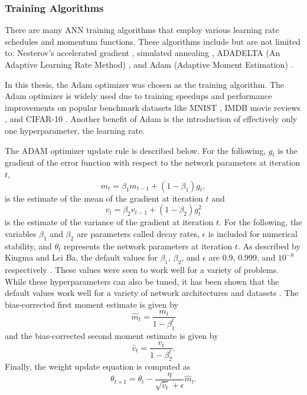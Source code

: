 \subsubsection{Training Algorithms}

There are many ANN training algorithms that employ various learning rate schedules and momentum functions. These algorithms include but are not limited to: Nesterov's accelerated gradient \cite{nesterov1983}, simulated annealing \cite{Kirkpatrick1983}, ADADELTA (An Adaptive Learning Rate Method) \cite{ADADELTA}, and Adam (Adaptive Moment Estimation) \cite{Kingma2015}. 

In this thesis, the Adam optimizer was chosen as the training algorithm. The Adam optimizer is widely used due to training speedups and performance improvements on popular benchmark datasets like MNIST \cite{lecun98}, IMDB movie reviews \cite{Maas2011}, and CIFAR-10 \cite{Krizhevsky2009}. Another benefit of Adam is the introduction of effectively only one hyperparameter, the learning rate.

The ADAM optimizer update rule is described below. For the following, $g_t$ is the gradient of the error function with respect to the network parameters at iteration $t$, 
\begin{equation} \label{eq:adam1}
m_t = \beta_1 m_{t-1} + (1 - \beta_1) g_t,
\end{equation}
is the estimate of the mean of the gradient at iteration $t$ and
\begin{equation} \label{eq:adam2}
v_t = \beta_2 v_{t-1} + (1 - \beta_2) g_t^2
\end{equation}
is the estimate of the variance of the gradient at iteration $t$. For the following, the variables $\beta_1$ and $\beta_2$ are parameters called decay rates, $\epsilon$ is included for numerical stability, and $\theta_t$ represents the network parameters at iteration $t$. As described by Kingma and Lei Ba, the default values for $\beta_1$, $\beta_2$, and $\epsilon$ are 0.9, 0.999, and $10^{-8}$ respectively \cite{Kingma2015}. These values were seen to work well for a variety of problems. While these hyperparameters can also be tuned, it has been shown that the default values work well for a variety of network architectures and datasets \cite{Kingma2015}. The bias-corrected first moment estimate is given by
\begin{equation} \label{eq:adam3}
\hat{m}_t = \dfrac{m_t}{1 - \beta^t_1}
\end{equation}
and the bias-corrected second moment estimate is given by 
\begin{equation} \label{eq:adam4}
\hat{v}_t = \dfrac{v_t}{1 - \beta^t_2}.
\end{equation}
Finally, the weight update equation is computed as
\begin{equation} \label{eq:adam5}
\theta_{t+1} = \theta_{t} - \dfrac{\eta}{\sqrt{\hat{v}_t} + \epsilon} \hat{m}_t.
\end{equation}


